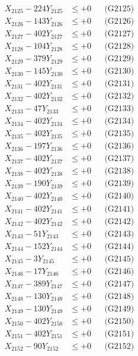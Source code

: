 \documentclass[a4paper,10pt]{article}
\begin{document}
{\begin{align}
X_{2125} - 224Y_{2125} &\leq +0 && \text{(G2125)} \\
X_{2126} - 143Y_{2126} &\leq +0 && \text{(G2126)} \\
X_{2127} - 402Y_{2127} &\leq +0 && \text{(G2127)} \\
X_{2128} - 104Y_{2128} &\leq +0 && \text{(G2128)} \\
X_{2129} - 379Y_{2129} &\leq +0 && \text{(G2129)} \\
X_{2130} - 145Y_{2130} &\leq +0 && \text{(G2130)} \\
\allowbreak
X_{2131} - 402Y_{2131} &\leq +0 && \text{(G2131)} \\
X_{2132} - 402Y_{2132} &\leq +0 && \text{(G2132)} \\
X_{2133} - 47Y_{2133} &\leq +0 && \text{(G2133)} \\
X_{2134} - 402Y_{2134} &\leq +0 && \text{(G2134)} \\
X_{2135} - 402Y_{2135} &\leq +0 && \text{(G2135)} \\
X_{2136} - 197Y_{2136} &\leq +0 && \text{(G2136)} \\
X_{2137} - 402Y_{2137} &\leq +0 && \text{(G2137)} \\
X_{2138} - 402Y_{2138} &\leq +0 && \text{(G2138)} \\
X_{2139} - 190Y_{2139} &\leq +0 && \text{(G2139)} \\
X_{2140} - 402Y_{2140} &\leq +0 && \text{(G2140)} \\
\allowbreak
X_{2141} - 402Y_{2141} &\leq +0 && \text{(G2141)} \\
X_{2142} - 402Y_{2142} &\leq +0 && \text{(G2142)} \\
X_{2143} - 51Y_{2143} &\leq +0 && \text{(G2143)} \\
X_{2144} - 152Y_{2144} &\leq +0 && \text{(G2144)} \\
X_{2145} - 3Y_{2145} &\leq +0 && \text{(G2145)} \\
X_{2146} - 17Y_{2146} &\leq +0 && \text{(G2146)} \\
X_{2147} - 389Y_{2147} &\leq +0 && \text{(G2147)} \\
X_{2148} - 130Y_{2148} &\leq +0 && \text{(G2148)} \\
X_{2149} - 130Y_{2149} &\leq +0 && \text{(G2149)} \\
X_{2150} - 402Y_{2150} &\leq +0 && \text{(G2150)} \\
\allowbreak
X_{2151} - 402Y_{2151} &\leq +0 && \text{(G2151)} \\
X_{2152} - 90Y_{2152} &\leq +0 && \text{(G2152)} \\

\end{align}}
\end{document}

